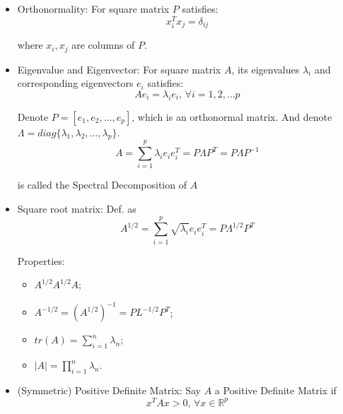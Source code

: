     \begin{itemize}[topsep=6pt,itemsep=4pt]
        \item Orthonormality: For square matrix $ P $ satisfies:
        \begin{equation}
            x_i^Tx_j=\delta _{ij} 
        \end{equation}

        where $ x_i,x_j $ are columns of $ P $.
        \item Eigenvalue and Eigenvector: For square matrix $ A $, its eigenvalues $ \lambda_i $ and corresponding eigenvectors $ e_i $ satisfies:
        \begin{equation}
            Ae_i=\lambda_ie_i,\,\forall i=1,2,\ldots p 
        \end{equation}

        Denote $ P=[e_1,e_2,\ldots ,e_p] $, which is an orthonormal matrix. And denote $ \Lambda =diag\{\lambda _1,\lambda _2,\ldots,\lambda _p\} $.
        \begin{equation}
            A=\sum_{i=1}^p\lambda _ie_ie_i^T=P \Lambda P^T=P\Lambda P^{-1}
        \end{equation}

        is called the Spectral Decomposition of $ A $

        
        
        \item Square root matrix: Def. as
        \begin{equation}
            A^{1/2}=\sum_{i=1}^p\sqrt{\lambda _i}e_ie_i^T=P\Lambda ^{1/2}P^T 
        \end{equation}

        Properties:
        \begin{itemize}[topsep=0pt,itemsep=-2pt]
            \item $ {\displaystyle A^{1/2}A^{1/2}A} $;
            \item $ {\displaystyle A^{-1/2}=(A^{1/2})^{-1}=PL^{-1/2}}P^T $;
            \item $ tr(A) =\sum_{i=1}^n\lambda _n$;
            \item $ |A|=\prod_{i=1}^n\lambda _n $.
        \end{itemize}
        
            
        \item (Symmetric) Positive Definite Matrix: Say $ A $ a Positive Definite Matrix if
        \begin{equation}
            x^TAx> 0,\,\forall x\in\mathbb{R}^p 
        \end{equation}


\end{itemize}
